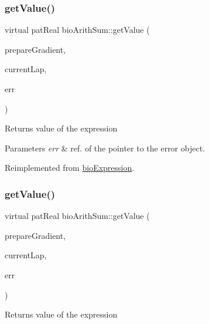 \subsubsection{\texorpdfstring{get\+Value()}{getValue()}\hspace{0.1cm}{\footnotesize\ttfamily [3/4]}}
{\footnotesize\ttfamily virtual pat\+Real bio\+Arith\+Sum\+::get\+Value (\begin{DoxyParamCaption}\item[{pat\+Boolean}]{prepare\+Gradient,  }\item[{pat\+U\+Long}]{current\+Lap,  }\item[{pat\+Error $\ast$\&}]{err }\end{DoxyParamCaption})\hspace{0.3cm}{\ttfamily [virtual]}}

\begin{DoxyReturn}{Returns}
value of the expression 
\end{DoxyReturn}

\begin{DoxyParams}{Parameters}
{\em err} & ref. of the pointer to the error object. \\
\hline
\end{DoxyParams}


Reimplemented from \hyperlink{classbio_expression_af58662a5d4d456f15bc4f2c9bd4f8a5b}{bio\+Expression}.

\mbox{\label{classbio_arith_sum_a3705cb2f1aebf4541131df5638a33379}} 
\subsubsection{\texorpdfstring{get\+Value()}{getValue()}\hspace{0.1cm}{\footnotesize\ttfamily [4/4]}}
{\footnotesize\ttfamily virtual pat\+Real bio\+Arith\+Sum\+::get\+Value (\begin{DoxyParamCaption}\item[{pat\+Boolean}]{prepare\+Gradient,  }\item[{pat\+U\+Long}]{current\+Lap,  }\item[{pat\+Error $\ast$\&}]{err }\end{DoxyParamCaption})\hspace{0.3cm}{\ttfamily [virtual]}}

\begin{DoxyReturn}{Returns}
value of the expression 
\end{DoxyReturn}

